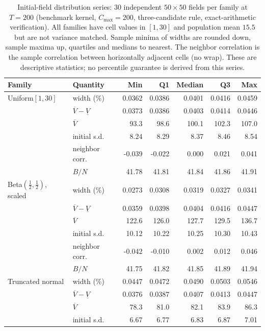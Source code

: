 \begin{table}[!tbp]\centering\footnotesize\setlength{\tabcolsep}{4pt}
\caption{Initial-field distribution series: $30$ independent $50\times50$ fields per family at $T=200$
(benchmark kernel, $C_{\max}=200$, three-candidate rule, exact-arithmetic verification). All families have
cell values in $[1,30]$ and population mean $15.5$ but are not variance matched. Sample minima of widths
are rounded down, sample maxima up, quartiles and medians to nearest. The neighbor correlation is the
sample correlation between horizontally adjacent cells (no wrap). These are descriptive statistics;
no percentile guarantee is derived from this series.}
\label{tab:distribution-series-si}
\begin{tabular}{llrrrrr}
\toprule
Family & Quantity & Min & Q1 & Median & Q3 & Max\\
\midrule
Uniform$[1,30]$ & width (\%) & 0.0362 & 0.0386 & 0.0401 & 0.0416 & 0.0459\\
 & $\overline V-\underline V$ & 0.0373 & 0.0386 & 0.0403 & 0.0414 & 0.0446\\
 & $\overline V$ & 93.3 & 98.6 & 100.1 & 102.3 & 107.0\\
 & initial s.d. & 8.24 & 8.29 & 8.37 & 8.46 & 8.54\\
 & neighbor corr. & -0.039 & -0.022 & 0.000 & 0.021 & 0.041\\
 & $B/N$ & 41.78 & 41.81 & 41.84 & 41.86 & 41.91\\
\addlinespace[3pt]
Beta$(\tfrac12,\tfrac12)$, scaled & width (\%) & 0.0273 & 0.0308 & 0.0319 & 0.0327 & 0.0341\\
 & $\overline V-\underline V$ & 0.0359 & 0.0398 & 0.0404 & 0.0416 & 0.0447\\
 & $\overline V$ & 122.6 & 126.0 & 127.7 & 129.5 & 136.7\\
 & initial s.d. & 10.12 & 10.22 & 10.25 & 10.30 & 10.43\\
 & neighbor corr. & -0.042 & -0.010 & 0.002 & 0.012 & 0.046\\
 & $B/N$ & 41.75 & 41.82 & 41.85 & 41.89 & 41.94\\
\addlinespace[3pt]
Truncated normal & width (\%) & 0.0447 & 0.0472 & 0.0490 & 0.0503 & 0.0546\\
 & $\overline V-\underline V$ & 0.0376 & 0.0387 & 0.0407 & 0.0413 & 0.0447\\
 & $\overline V$ & 78.3 & 81.0 & 82.1 & 83.9 & 86.3\\
 & initial s.d. & 6.67 & 6.77 & 6.83 & 6.87 & 7.01\\

\end{tabular}
\end{table}
